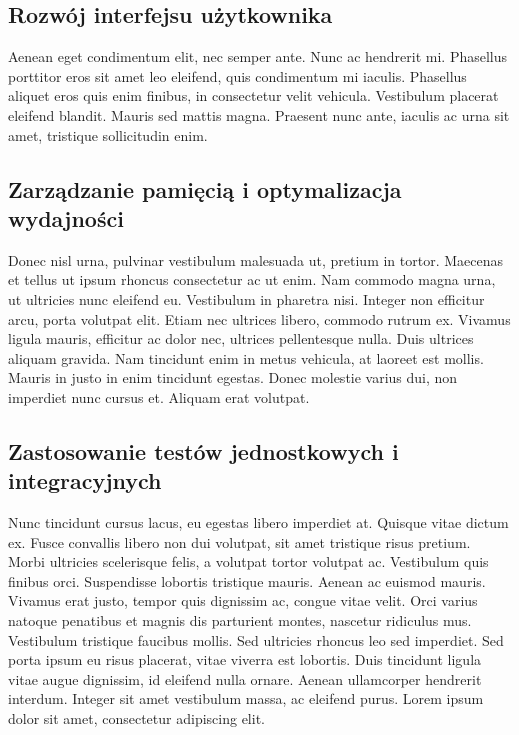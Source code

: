 \subsection{Rozwój interfejsu użytkownika}
\begin{spacing}{1.5} %
    Aenean eget condimentum elit, nec semper ante. Nunc ac hendrerit mi. Phasellus porttitor eros sit amet leo eleifend, quis condimentum mi iaculis. Phasellus aliquet eros quis enim finibus, in consectetur velit vehicula. Vestibulum placerat eleifend blandit. Mauris sed mattis magna. Praesent nunc ante, iaculis ac urna sit amet, tristique sollicitudin enim. 
\end{spacing} %

\subsection{Zarządzanie pamięcią i optymalizacja wydajności}
\begin{spacing}{1.5} %
    Donec nisl urna, pulvinar vestibulum malesuada ut, pretium in tortor. Maecenas et tellus ut ipsum rhoncus consectetur ac ut enim. Nam commodo magna urna, ut ultricies nunc eleifend eu. Vestibulum in pharetra nisi. Integer non efficitur arcu, porta volutpat elit. Etiam nec ultrices libero, commodo rutrum ex. Vivamus ligula mauris, efficitur ac dolor nec, ultrices pellentesque nulla. Duis ultrices aliquam gravida. Nam tincidunt enim in metus vehicula, at laoreet est mollis. Mauris in justo in enim tincidunt egestas. Donec molestie varius dui, non imperdiet nunc cursus et. Aliquam erat volutpat. 
\end{spacing} %

\subsection{Zastosowanie testów jednostkowych i integracyjnych}
\begin{spacing}{1.5} %
    Nunc tincidunt cursus lacus, eu egestas libero imperdiet at. Quisque vitae dictum ex. Fusce convallis libero non dui volutpat, sit amet tristique risus pretium. Morbi ultricies scelerisque felis, a volutpat tortor volutpat ac. Vestibulum quis finibus orci. Suspendisse lobortis tristique mauris. Aenean ac euismod mauris. Vivamus erat justo, tempor quis dignissim ac, congue vitae velit. Orci varius natoque penatibus et magnis dis parturient montes, nascetur ridiculus mus. Vestibulum tristique faucibus mollis. Sed ultricies rhoncus leo sed imperdiet. Sed porta ipsum eu risus placerat, vitae viverra est lobortis. Duis tincidunt ligula vitae augue dignissim, id eleifend nulla ornare. Aenean ullamcorper hendrerit interdum. Integer sit amet vestibulum massa, ac eleifend purus. Lorem ipsum dolor sit amet, consectetur adipiscing elit. 
\end{spacing} %

